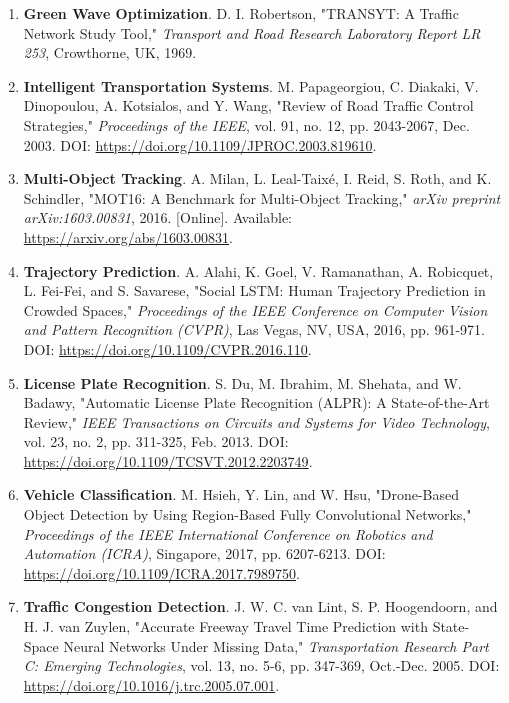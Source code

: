 \begin{enumerate}[resume]
    \item \textbf{Green Wave Optimization}. D. I. Robertson, "TRANSYT: A Traffic Network Study Tool," 
    \textit{Transport and Road Research Laboratory Report LR 253}, Crowthorne, UK, 1969.
    
    \item \textbf{Intelligent Transportation Systems}. M. Papageorgiou, C. Diakaki, V. Dinopoulou, A. Kotsialos, and Y. Wang, 
    "Review of Road Traffic Control Strategies," \textit{Proceedings of the IEEE}, vol. 91, no. 12, pp. 2043-2067, Dec. 2003. 
    DOI: \url{https://doi.org/10.1109/JPROC.2003.819610}.
    
    \item \textbf{Multi-Object Tracking}. A. Milan, L. Leal-Taixé, I. Reid, S. Roth, and K. Schindler, 
    "MOT16: A Benchmark for Multi-Object Tracking," \textit{arXiv preprint arXiv:1603.00831}, 2016. 
    [Online]. Available: \url{https://arxiv.org/abs/1603.00831}.
    
    \item \textbf{Trajectory Prediction}. A. Alahi, K. Goel, V. Ramanathan, A. Robicquet, L. Fei-Fei, and S. Savarese, 
    "Social LSTM: Human Trajectory Prediction in Crowded Spaces," 
    \textit{Proceedings of the IEEE Conference on Computer Vision and Pattern Recognition (CVPR)}, 
    Las Vegas, NV, USA, 2016, pp. 961-971. DOI: \url{https://doi.org/10.1109/CVPR.2016.110}.
    
    \item \textbf{License Plate Recognition}. S. Du, M. Ibrahim, M. Shehata, and W. Badawy, 
    "Automatic License Plate Recognition (ALPR): A State-of-the-Art Review," 
    \textit{IEEE Transactions on Circuits and Systems for Video Technology}, vol. 23, no. 2, pp. 311-325, Feb. 2013. 
    DOI: \url{https://doi.org/10.1109/TCSVT.2012.2203749}.
    
    \item \textbf{Vehicle Classification}. M. Hsieh, Y. Lin, and W. Hsu, "Drone-Based Object Detection by Using Region-Based Fully Convolutional Networks," 
    \textit{Proceedings of the IEEE International Conference on Robotics and Automation (ICRA)}, 
    Singapore, 2017, pp. 6207-6213. DOI: \url{https://doi.org/10.1109/ICRA.2017.7989750}.
    
    \item \textbf{Traffic Congestion Detection}. J. W. C. van Lint, S. P. Hoogendoorn, and H. J. van Zuylen, 
    "Accurate Freeway Travel Time Prediction with State-Space Neural Networks Under Missing Data," 
    \textit{Transportation Research Part C: Emerging Technologies}, vol. 13, no. 5-6, pp. 347-369, Oct.-Dec. 2005. 
    DOI: \url{https://doi.org/10.1016/j.trc.2005.07.001}.
    

\end{enumerate}
